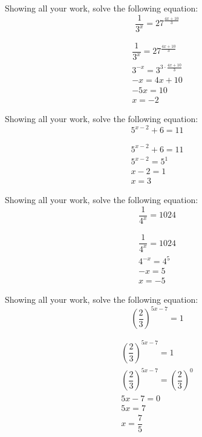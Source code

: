 \documentclass[11pt,letterpaper]{article}
\begin{document}
\newpage



 Showing all your work, solve the following equation:
	\[
	\dfrac{1}{3^x}= 27^{\frac{4x + 10}{3}}
	\] \pspace

\sol
	\begin{gather*}
	\dfrac{1}{3^x}= 27^{\frac{4x + 10}{3}} \\[0.3cm]
	3^{-x}= 3^{3 \cdot \frac{4x + 10}{3}} \\[0.3cm]
	-x= 4x + 10 \\[0.3cm]
	-5x= 10 \\[0.3cm]
	x= -2
	\end{gather*}



\newpage



 Showing all your work, solve the following equation:
	\[
	5^{x - 2} + 6= 11
	\] \pspace

\sol
	\begin{gather*}
	5^{x - 2} + 6= 11 \\[0.3cm]
	5^{x - 2}= 5^1 \\[0.3cm]
	x - 2= 1 \\[0.3cm]
	x= 3
	\end{gather*}



\newpage



 Showing all your work, solve the following equation:
	\[
	\dfrac{1}{4^x}= 1024
	\] \pspace

\sol
	\begin{gather*}
	\dfrac{1}{4^x}= 1024 \\[0.3cm]
	4^{-x}= 4^{5} \\[0.3cm]
	-x= 5 \\[0.3cm]
	x= -5
	\end{gather*}



\newpage



 Showing all your work, solve the following equation:
	\[
	\left( \dfrac{2}{3} \right)^{5x - 7}= 1
	\] \pspace

\sol
	\begin{gather*}
	\left( \dfrac{2}{3} \right)^{5x - 7}= 1 \\[0.3cm]
	\left( \dfrac{2}{3} \right)^{5x - 7}= \left( \dfrac{2}{3} \right)^0 \\[0.3cm]
	5x - 7= 0 \\[0.3cm]
	5x= 7 \\[0.3cm]
	x= \dfrac{7}{5}
	\end{gather*}
\end{document}
